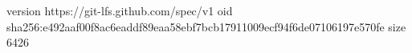version https://git-lfs.github.com/spec/v1
oid sha256:e492aaf00f8ac6eaddf89eaa58ebf7bcb17911009ecf94f6de07106197e570fe
size 6426

